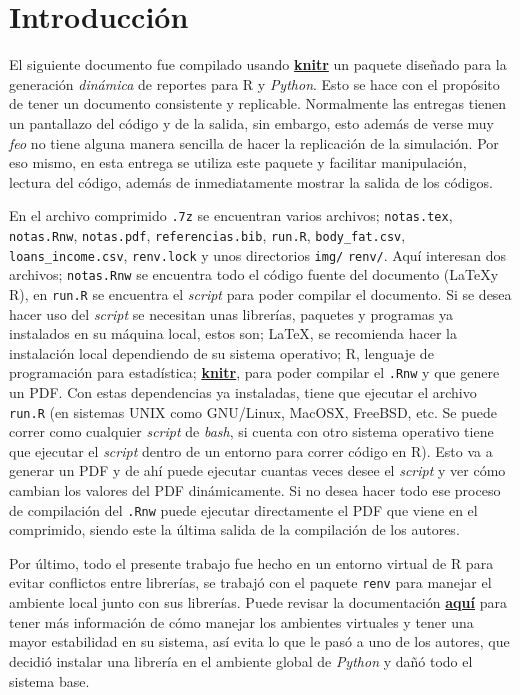 \documentclass[12pt]{article}\usepackage[]{graphicx}\usepackage[]{xcolor}
\begin{document}
\section{Introducción}

El siguiente documento fue compilado usando \href{https://yihui.org/knitr/}{\textbf{knitr}} un paquete diseñado para la generación \textit{dinámica} de reportes para \textsf{R} y \textit{Python}. Esto se hace con el propósito de tener un documento consistente y replicable. Normalmente las entregas tienen un pantallazo del código y de la salida, sin embargo, esto además de verse muy \textit{feo} no tiene alguna manera sencilla de hacer la replicación de la simulación. Por eso mismo, en esta entrega se utiliza este paquete y facilitar manipulación, lectura del código, además de inmediatamente mostrar la salida de los códigos.

En el archivo comprimido \texttt{.7z} se encuentran varios archivos; \texttt{notas.tex}, \texttt{notas.Rnw}, \texttt{notas.pdf}, \texttt{referencias.bib}, \texttt{run.R}, \texttt{body\_fat.csv}, \texttt{loans\_income.csv}, \texttt{renv.lock} y unos directorios \texttt{img/} \texttt{renv/}. Aquí interesan dos archivos; \texttt{notas.Rnw} se encuentra todo el código fuente del documento (\LaTeX y \textsf{R}), en \texttt{run.R} se encuentra el \textit{script} para poder compilar el documento. Si se desea hacer uso del \textit{script} se necesitan unas librerías, paquetes y programas ya instalados en su máquina local, estos son; \LaTeX, se recomienda hacer la instalación local dependiendo de su sistema operativo; \textsf{R}, lenguaje de programación para estadística; \href{https://yihui.org/knitr/}{\textbf{knitr}}, para poder compilar el \texttt{.Rnw} y que genere un PDF. Con estas dependencias ya instaladas, tiene que ejecutar el archivo \texttt{run.R} (en sistemas UNIX como GNU/Linux, MacOSX, FreeBSD, etc. Se puede correr como cualquier \textit{script} de \textit{bash}, si cuenta con otro sistema operativo tiene que ejecutar el \textit{script} dentro de un entorno para correr código en \textsf{R}). Esto va a generar un PDF y de ahí puede ejecutar cuantas veces desee el \textit{script} y ver cómo cambian los valores del PDF dinámicamente. Si no desea hacer todo ese proceso de compilación del \texttt{.Rnw} puede ejecutar directamente el PDF que viene en el comprimido, siendo este la última salida de la compilación de los autores.

Por último, todo el presente trabajo fue hecho en un entorno virtual de \textsf{R} para evitar conflictos entre librerías, se trabajó con el paquete \lstinline|renv| para manejar el ambiente local junto con sus librerías. Puede revisar la documentación \href{https://rstudio.github.io/renv/articles/renv.html}{\textbf{aquí}} para tener más información de cómo manejar los ambientes virtuales y tener una mayor estabilidad en su sistema, así evita lo que le pasó a uno de los autores, que decidió instalar una librería en el ambiente global de \textit{Python} y dañó todo el sistema base.
\end{document}
